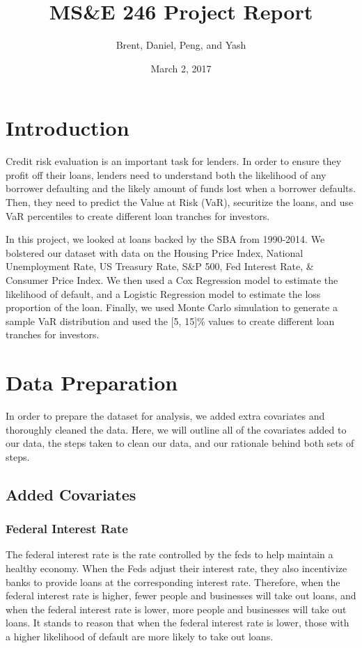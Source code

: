 \documentclass[]{report}
\title{MS\&E 246 Project Report}
\date{March 2, 2017}
\author{Brent, Daniel, Peng, and Yash}
\begin{document}
\maketitle

\section*{Introduction}

	\tab Credit risk evaluation is an important task for lenders. In order to ensure they profit off their loans, lenders need to understand both the likelihood of any borrower defaulting and the likely amount of funds lost when a borrower defaults. Then, they need to predict the Value at Risk (VaR), securitize the loans, and use VaR percentiles to create different loan tranches for investors.
	
	In this project, we looked at loans backed by the SBA from 1990-2014. We bolstered our dataset with data on the Housing Price Index, National Unemployment Rate, US Treasury Rate, S\&P 500, Fed Interest Rate, \& Consumer Price Index.	We then used a Cox Regression model to estimate the likelihood of default, and a Logistic Regression model to estimate the loss proportion of the loan. Finally, we used Monte Carlo simulation to generate a sample VaR distribution and used the [5, 15]\% values to create different loan tranches for investors.
	
\section*{Data Preparation}

	\tab In order to prepare the dataset for analysis, we added extra covariates  and thoroughly cleaned the data. Here, we will outline all of the covariates added to our data, the steps taken to clean our data, and our rationale behind both sets of steps.
	
	\subsection*{Added Covariates}
	
	\subsubsection{Federal Interest Rate}
		\tab The federal interest rate is the rate controlled by the feds to help maintain a healthy economy. When the Feds adjust their interest rate, they also incentivize banks to provide loans at the corresponding interest rate. Therefore, when the federal interest rate is higher, fewer people and businesses will take out loans, and when the federal interest rate is lower, more people and businesses will take out loans. It stands to reason that when the federal interest rate is lower, those with a higher likelihood of default are more likely to take out loans.
		
\end{document}
